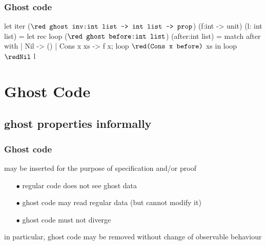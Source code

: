 \documentclass[xcolor=dvipsnames]{beamer}
\begin{document}
\begin{frame}[fragile]
\frametitle{Ghost code}
\hspace*{-1em}
\begin{whycode}
let iter (${\texttt{{\red ghost inv}:int list -> int list -> prop}}$) 
(f:int -> unit) (l: int list)
= let rec loop (${ \texttt{{\red ghost before}:int list}}$) (after:int list)
  = match after with
     | Nil       -> ()
     | Cons x xs -> f x; loop ${\red \texttt{(Cons x before)}}$ xs
  in loop ${\red\texttt{Nil}}$ l
\end{whycode}
\end{frame}

\section*{Ghost Code}

\subsection*{ghost properties informally}

\begin{frame}
\frametitle{{Ghost code}}
	may be inserted for the purpose of specification and/or proof \\[1em]
	\pause	
	\begin{itemize}
	\item[\red $\bullet$] regular code does not see ghost data
	\item[\red $\bullet$] ghost code may read regular data (but cannot modify it)
	\item[\red $\bullet$] ghost code must not diverge\\[1em]
	\end{itemize}
in particular, ghost code may be removed without change of observable behaviour
\end{frame}
\end{document}
